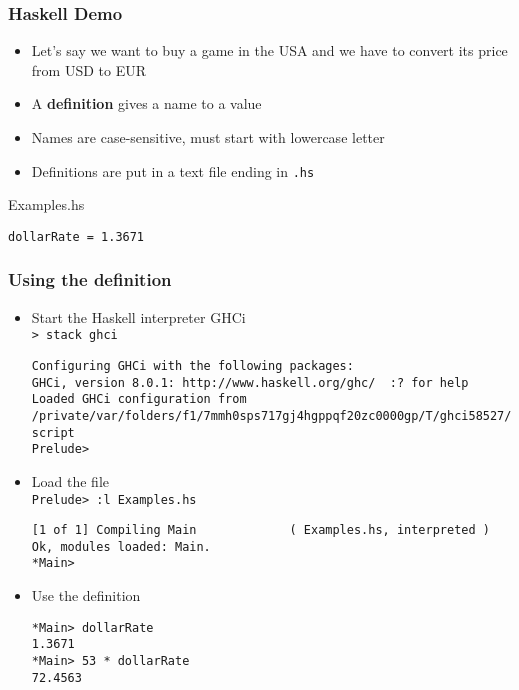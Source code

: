 \documentclass{beamer}
\begin{document}

\begin{frame}[fragile]
  \frametitle{Haskell Demo}
  \begin{itemize}
  \item  Let's say we want to buy a game in the USA and we have to
    convert its price from USD to EUR
  \item  A \textbf{definition} gives a name to a value
  \item Names are  case-sensitive, must start with lowercase letter
  \item Definitions are  put in a text file ending in \texttt{.hs}
  \end{itemize}
  \begin{block}{Examples.hs}
\begin{verbatim}
dollarRate = 1.3671
\end{verbatim}
  \end{block}
\end{frame}
\begin{frame}[fragile]
  \frametitle{Using the definition}
  \begin{itemize}
  \item Start the Haskell interpreter  GHCi\\
    \texttt{> stack ghci}
\begin{verbatim}
Configuring GHCi with the following packages: 
GHCi, version 8.0.1: http://www.haskell.org/ghc/  :? for help
Loaded GHCi configuration from /private/var/folders/f1/7mmh0sps717gj4hgppqf20zc0000gp/T/ghci58527/ghci-script
Prelude> 
\end{verbatim}
  \item Load the file\\
    \texttt{Prelude> :l Examples.hs}
\begin{verbatim}
[1 of 1] Compiling Main             ( Examples.hs, interpreted )
Ok, modules loaded: Main.
*Main> 
\end{verbatim}
  \item Use the definition
\begin{verbatim}
*Main> dollarRate
1.3671
*Main> 53 * dollarRate
72.4563
\end{verbatim}
  \end{itemize}
\end{frame}
\end{document}
